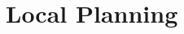 
\graphicspath{{./images/chapter07/bmps/}{./images/chapter07/vects/}{./images/chapter07/}}

\chapter{Local Planning}\label{ch:chapter07}

% 
% 
% 
% 
% 
% 
% 
% 
% 
% 
